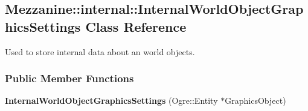 \hypertarget{classMezzanine_1_1internal_1_1InternalWorldObjectGraphicsSettings}{
\subsection{Mezzanine::internal::InternalWorldObjectGraphicsSettings Class Reference}
\label{classMezzanine_1_1internal_1_1InternalWorldObjectGraphicsSettings}
}


Used to store internal data about an world objects.  


\subsubsection*{Public Member Functions}
\begin{DoxyCompactItemize}
\item 
\hypertarget{classMezzanine_1_1internal_1_1InternalWorldObjectGraphicsSettings_a1299e1bff35596b9aa614fe9a3ff46eb}{
{\bfseries InternalWorldObjectGraphicsSettings} (Ogre::Entity $\ast$GraphicsObject)}
\label{classMezzanine_1_1internal_1_1InternalWorldObjectGraphicsSettings_a1299e1bff35596b9aa614fe9a3ff46eb}

\end{DoxyCompactItemize}
